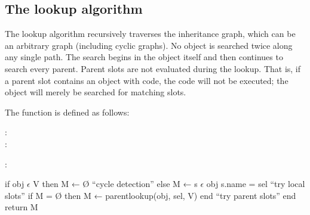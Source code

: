 \documentclass[letterpaper,10pt,english]{sphinxmanual}
\begin{document}

\subsection{The lookup algorithm}
\label{\detokenize{langref:pp-lookup-algorithm}}\label{\detokenize{langref:the-lookup-algorithm}}\label{\detokenize{langref:index-55}}
The lookup algorithm recursively traverses the inheritance graph, which can be an arbitrary graph (including cyclic graphs). No object is searched twice along any single path. The search begins in the object itself and then continues to search every parent. Parent slots are not evaluated during the lookup. That is, if a parent slot contains an object with code, the code will not be executed; the object will merely be searched for matching slots.

The function  is defined as follows:
\begin{description}
\item[{:}] \leavevmode
{}

\item[{:}] \leavevmode
{}

\end{description}

:

\begin{sphinxVerbatim}[commandchars=\\\{\}]
if obj \(\epsilon\) V
then M ← Ø                                                  “cycle detection”
else M ← \PYGZob{}s \(\epsilon\) obj \textbar{} s.name = sel\PYGZcb{}                           “try local slots”
    if M = Ø then M ← parent\PYGZus{}lookup(obj, sel, V) end        “try parent slots”
end
return M
\end{sphinxVerbatim}
\end{document}
